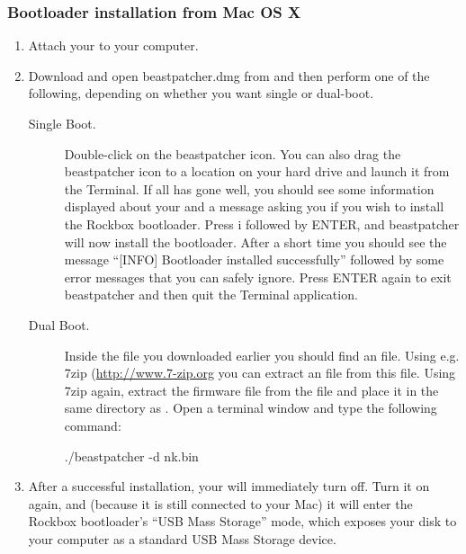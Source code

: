 \subsubsection{Bootloader installation from Mac OS X}
\begin{enumerate}
\item Attach your \dap{} to your computer.

\item Download and open beastpatcher.dmg from 
and then perform one of the following,
depending on whether you want single or dual-boot.

\begin{description}
\item [Single Boot.] Double-click on the beastpatcher icon. You can also
drag the beastpatcher icon to a location on your hard drive and launch
it from the Terminal. If all has gone well, you should see some 
information displayed about your \dap{} and a message asking you if you 
wish to install the Rockbox bootloader. Press i followed by ENTER, and 
beastpatcher will now install the bootloader. After a short time you 
should see the message ``[INFO] Bootloader installed successfully''
followed by some error messages that you can safely ignore. Press 
ENTER again to exit beastpatcher and then quit the Terminal application.

\item [Dual Boot.] Inside the  file you downloaded earlier
you should find an  file.  Using e.g. 7zip
(\url{http://www.7-zip.org} you can extract an  file from this
 file.  Using 7zip again, extract the \playerman{} firmware file
 from the  file and place it in the same
directory as .  Open a terminal window and type the
following command:

\begin{code} 
    ./beastpatcher -d nk.bin
\end{code}
\end{description}

\item After a successful installation, your \dap{} will immediately turn off.
Turn it on again, and (because it is still connected to your Mac)
it will enter the Rockbox bootloader's
``USB Mass Storage'' mode, which exposes your \daps{} disk to your computer
as a standard USB Mass Storage device.
\end{enumerate}

